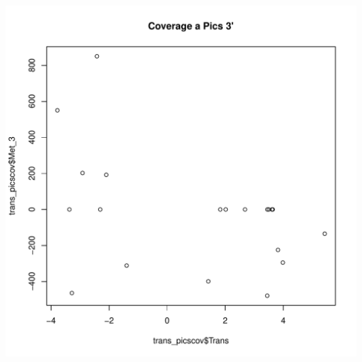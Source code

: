 \documentclass{article}\usepackage[]{graphicx}\usepackage[]{color}
\makeatletter
\def\maxwidth{ %
  \ifdim\Gin@nat@width>\linewidth
    \linewidth
  \else
    \Gin@nat@width
  \fi
}
\newenvironment{knitrout}{}{} %
\makeatother
\begin{document}
\begin{knitrout}
{\includegraphics[width=\maxwidth]{figure/minimal-correlacions_trans-9} 

}



\end{knitrout}
\clearpage
\end{document}
